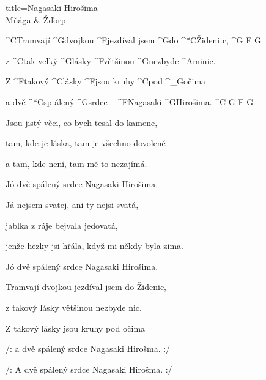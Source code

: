 \begin{song}{title=\predtitle\centering Nagasaki Hirošima \\\large Mňága \&  Žďorp  \vspace*{-0.3cm}}  %
\begin{centerjustified}
\nejnejvetsi

\sloka
	^{C\z }Tramvají ^{G\z }dvojkou ^{F\z }jezdíval jsem ^{G}do ^*{\z C}Žideni c, ^{G\,\,F\,\,G}

	z ^{C}tak velký ^{G\z }lásky ^{F\z}většinou ^{G\z }nezbyde ^{Ami\z }nic.~~~

	Z ^{F\z }takový ^{C\z}lásky ^{F\z}jsou kruhy ^{C\z}pod ^{{\color{white}\_}G}očima

	a dvě ^*{C}sp álený ^{G\z }srdce -- ^{F\z }Nagasaki ^{G\z}Hirošima. ^{C\,\,G\,\,F\,\,G}

\sloka
	Jsou jistý věci, co bych tesal do kamene,
	
	tam, kde je láska, tam je všechno dovolené
	
	a tam, kde není, tam mě to nezajímá.
	
	Jó dvě spálený srdce Nagasaki Hirošima.

\sloka
	Já nejsem svatej, ani ty nejsi svatá,
	
	jablka z ráje bejvala jedovatá,
	
	jenže hezky jsi hřála, když mi někdy byla zima.
	
	Jó dvě spálený srdce Nagasaki Hirošima.

\sloka
	Tramvají dvojkou jezdíval jsem do Židenic,
	
	z takový lásky většinou nezbyde nic.
	
	Z takový lásky jsou kruhy pod očima

	/: a dvě spálený srdce Nagasaki Hirošma. :/
	
	/: A dvě spálený srdce Nagasaki Hirošma. :/

\end{centerjustified}
\setcounter{Slokočet}{0}
\end{song}


